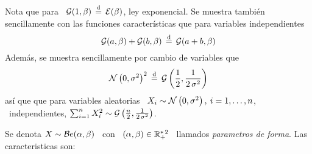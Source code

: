 Nota  que para  \ $\mathcal{G}(1,\beta)  \, \stackrel{\mathrm{d}}{=}  \, \mathcal{E}(\beta)$,  ley  exponencial.  Se
muestra  tambi\'en sencillamente  con las  funciones caracter\'isticas  que para
variables independientes
%
\[
\mathcal{G}(a,\beta) + \mathcal{G}(b,\beta) \, \stackrel{\mathrm{d}}{=} \, \mathcal{G}(a+b,\beta)
\]
%
Adem\'as, se muestra sencillamente por cambio de variables que
%
\[
\mathcal{N}\left( 0  , \sigma^2 \right)^2 \,  \stackrel{\mathrm{d}}{=} \, \mathcal{G}\left( \frac12  , \frac{1}{2 \,
\sigma^2} \right)
\]
%
as\'i  que que  para variables  aleatorias  \ $X_i  \sim \mathcal{N}\left(  0 ,  \sigma^2
\right),  \: i  = 1,  \ldots ,  n$, \  independientes, $\sum_{i=1}^n  X_i^2 \sim
\mathcal{G}\left(   \frac{n}{2}   ,   \frac{1}{2   \,   \sigma^2}   \right)$.    





Se denota $X  \sim \mathcal{B}e(\alpha,\beta)$ \ con \  $(\alpha,\beta) \in \mathbb{R}_+^{* \,
2}$ \ llamados {\em parametros de forma}.  Las caracteristicas son:

